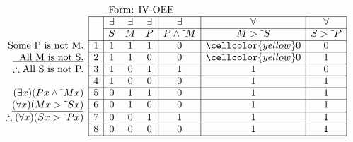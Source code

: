 \documentclass[10pt,legalpaper,landscape,cmtt]{article}
\begin{document}
{\begin{minipage}[t]{3.25in}
	\(
	\begin{array}{r|c|ccc|c|c|c|}
		\multicolumn{2}{c}{}&\multicolumn{6}{l}{\mbox{Form: IV-OEE}} \\ \cline{2-8}
		\hspace{1in}	&	& \exists & \exists & \exists & \exists & \forall & \forall\\ \cline{3-8}
		&	& S & M & P &  P \wedge \tilde~M  &  M > \tilde~S  &  S > \tilde~P \\ \cline{2-8} \cline{2-8}
		\phantom{\therefore}\mbox{Some P is not M.}   & 1 & 1 & 1 & 1 &   0   &   \cellcolor{yellow} 0   &   0  \\ \cline{2-8}
		\underline{\phantom{\therefore}\mbox{All M is not S.}}   & 2 & 1 & 1 & 0 &   0   &   \cellcolor{yellow} 0   &   1  \\ \cline{2-8}
		\therefore \mbox{All S is not P.}   & 3 & 1 & 0 & 1 &   1   &   1   &   0  \\ \cline{2-8}
		& 4 & 1 & 0 & 0 &   0   &   1   &   1  \\ \cline{2-8}
		(\exists x)(Px \wedge \tilde~Mx)   & 5 & 0 & 1 & 1 &   0   &   1   &   1  \\ \cline{2-8}
		\underline{(\forall x)(Mx > \tilde~Sx)}   & 6 & 0 & 1 & 0 &   0   &   1   &   1  \\ \cline{2-8}
		\therefore(\forall x)(Sx > \tilde~Px)   & 7 & 0 & 0 & 1 &   1   &   1   &   1  \\ \cline{2-8}
		& 8 & 0 & 0 & 0 &   0   &   1   &   1   \\ \cline{2-8}\cline{2-8} 
	\end{array}
	\)
\end{minipage}

}
\end{document}
